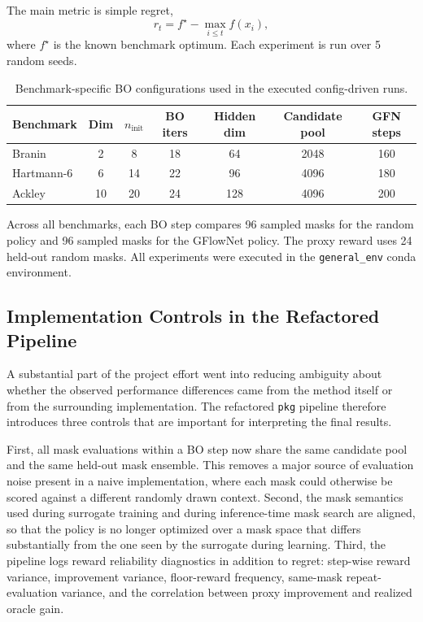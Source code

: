 \documentclass{article}
\begin{document}
The main metric is simple regret,
\[
r_t = f^\star - \max_{i \le t} f(x_i),
\]
where $f^\star$ is the known benchmark optimum. Each experiment is run over 5 random seeds.

\begin{table}[t]
\centering
\caption{Benchmark-specific BO configurations used in the executed config-driven runs.}
\label{tab:configs}
\small
\begin{tabular}{lcccccc}
\toprule
Benchmark & Dim & $n_{\text{init}}$ & BO iters & Hidden dim & Candidate pool & GFN steps \\
\midrule
Branin & 2 & 8 & 18 & 64 & 2048 & 160 \\
Hartmann-6 & 6 & 14 & 22 & 96 & 4096 & 180 \\
Ackley & 10 & 20 & 24 & 128 & 4096 & 200 \\
\bottomrule
\end{tabular}
\end{table}

Across all benchmarks, each BO step compares 96 sampled masks for the random policy and 96 sampled masks for the GFlowNet policy. The proxy reward uses 24 held-out random masks. All experiments were executed in the \texttt{general\_env} conda environment.

\subsection{Implementation Controls in the Refactored Pipeline}

A substantial part of the project effort went into reducing ambiguity about whether the observed performance differences came from the method itself or from the surrounding implementation. The refactored \texttt{pkg} pipeline therefore introduces three controls that are important for interpreting the final results.

First, all mask evaluations within a BO step now share the same candidate pool and the same held-out mask ensemble. This removes a major source of evaluation noise present in a naive implementation, where each mask could otherwise be scored against a different randomly drawn context. Second, the mask semantics used during surrogate training and during inference-time mask search are aligned, so that the policy is no longer optimized over a mask space that differs substantially from the one seen by the surrogate during learning. Third, the pipeline logs reward reliability diagnostics in addition to regret: step-wise reward variance, improvement variance, floor-reward frequency, same-mask repeat-evaluation variance, and the correlation between proxy improvement and realized oracle gain.
\end{document}
